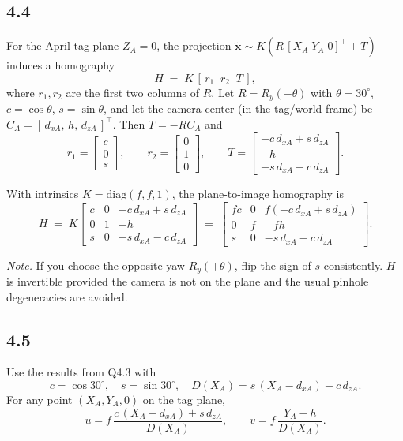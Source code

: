 \documentclass[12pt]{article}
\begin{document}
\subsection*{4.4}
For the April tag plane \(Z_A=0\), the projection
\(\tilde{\mathbf{x}} \sim K\!\left(R\,[X_A\;Y_A\;0]^\top + T\right)\)
induces a homography
\[
H \;=\; K\,[\,r_1\;\; r_2\;\; T\,],
\]
where \(r_1,r_2\) are the first two columns of \(R\).
Let \(R = R_y(-\theta)\) with \(\theta=30^\circ\), \(c=\cos\theta\), \(s=\sin\theta\), and let the
camera center (in the tag/world frame) be \(C_A=[\,d_{xA},\,h,\,d_{zA}\,]^\top\).
Then \(T=-RC_A\) and
\[
r_1=\begin{bmatrix}c\\[2pt]0\\[2pt]s\end{bmatrix},\qquad
r_2=\begin{bmatrix}0\\[2pt]1\\[2pt]0\end{bmatrix},\qquad
T=\begin{bmatrix}-c\,d_{xA}+s\,d_{zA}\\[2pt]-h\\[2pt]-s\,d_{xA}-c\,d_{zA}\end{bmatrix}.
\]

With intrinsics \(K=\mathrm{diag}(f,f,1)\), the plane-to-image homography is
\[
\boxed{
H \;=\;
K\!
\begin{bmatrix}
c & 0 & -c\,d_{xA}+s\,d_{zA}\\[4pt]
0 & 1 & -h\\[4pt]
s & 0 & -s\,d_{xA}-c\,d_{zA}
\end{bmatrix}
\;=\;
\begin{bmatrix}
f c & 0 & f(-c\,d_{xA}+s\,d_{zA})\\[4pt]
0 & f & -f h\\[4pt]
s & 0 & -s\,d_{xA}-c\,d_{zA}
\end{bmatrix}.
}
\]

\textit{Note.} If you choose the opposite yaw \(R_y(+\theta)\), flip the sign of \(s\) consistently.
\(H\) is invertible provided the camera is not on the plane and the usual pinhole
degeneracies are avoided.

\subsection*{4.5}
Use the results from Q4.3 with
\[
c=\cos 30^\circ,\quad s=\sin 30^\circ,\quad
D(X_A)=s\,(X_A-d_{xA})-c\,d_{zA}.
\]
For any point \((X_A,Y_A,0)\) on the tag plane,
\[
u = f\,\frac{c\,(X_A-d_{xA})+s\,d_{zA}}{D(X_A)},\qquad
v = f\,\frac{Y_A-h}{D(X_A)}.
\]
\end{document}
